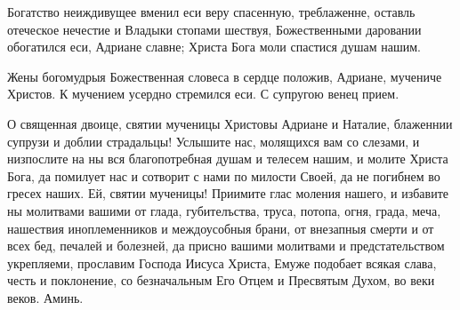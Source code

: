 \begin{mymulticols}



Богатство неиждивущее вменил еси веру спасенную, треблаженне, оставль отеческое нечестие и Владыки стопами шествуя, Божественными даровании обогатился еси, Адриане славне; Христа Бога моли спастися душам нашим.




Жены богомудрыя Божественная словеса в сердце положив, Адриане, мучениче Христов. К мучением усердно стремился еси. С супругою венец прием.




О священная двоице, святии мученицы Христовы Адриане и Наталие, блаженнии супрузи и доблии страдальцы! Услышите нас, молящихся вам со слезами, и низпослите на ны вся благопотребная душам и телесем нашим, и молите Христа Бога, да помилует нас и сотворит с нами по милости Своей, да не погибнем во гресех наших. Ей, святии мученицы! Приимите глас моления нашего, и избавите ны молитвами вашими от глада, губителъства, труса, потопа, огня, града, меча, нашествия иноплеменников и междоусобныя брани, от внезапныя смерти и от всех бед, печалей и болезней, да присно вашими молитвами и предстательством укрепляеми, прославим Господа Иисуса Христа, Емуже подобает всякая слава, честь и поклонение, со безначальным Его Отцем и Пресвятым Духом, во веки веков. Аминь.


\end{mymulticols}

\mychapterending


